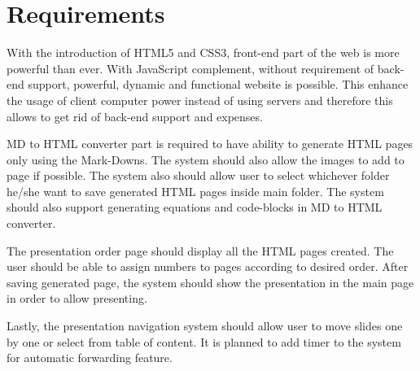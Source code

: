 \section{Requirements}

With the introduction of HTML5 and CSS3, front-end part of the web is more powerful than ever. With JavaScript complement, without requirement of back-end support, powerful, dynamic and functional website is possible. This enhance the usage of client computer power instead of using servers and therefore this allows to get rid of back-end support and expenses.

MD to HTML converter part is required to have ability to generate HTML pages only using the Mark-Downs. The system should also allow the images to add to page if possible. The system also should allow user to select whichever folder he/she want to save generated HTML pages inside main folder. The system should also support generating equations and code-blocks in MD to HTML converter.

The presentation order page should display all the HTML pages created. The user should be able to assign numbers to pages according to desired order. After saving generated page, the system should show the presentation in the main page in order to allow presenting.

Lastly, the presentation navigation system should allow user to move slides one by one or select from table of content. It is planned to add timer to the system for automatic forwarding feature.